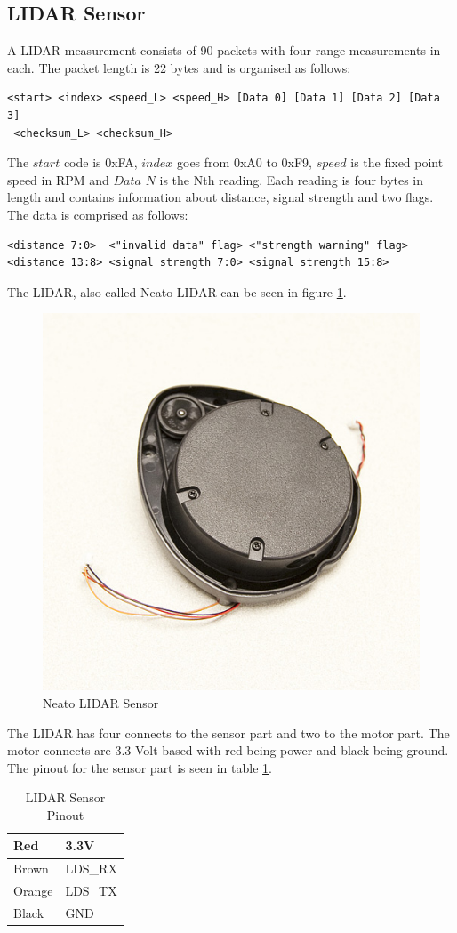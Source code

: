 \subsection{LIDAR Sensor}
A LIDAR measurement consists of 90 packets with four range measurements in each. The packet length is 22 bytes and is organised as follows\cite{LIDAR}:
\begin{verbatim}
<start> <index> <speed_L> <speed_H> [Data 0] [Data 1] [Data 2] [Data 3]
 <checksum_L> <checksum_H>
\end{verbatim}
The $start$ code is 0xFA, $index$ goes from 0xA0 to 0xF9, $speed$ is the fixed point speed in RPM and $Data$ $N$ is the Nth reading. Each reading is four bytes in length and contains information about distance, signal strength and two flags. The data is comprised as follows:
\begin{verbatim}
<distance 7:0>  <"invalid data" flag> <"strength warning" flag> 
<distance 13:8> <signal strength 7:0> <signal strength 15:8>
\end{verbatim}
The LIDAR, also called Neato LIDAR can be seen in figure \ref{fig:NeatoLidar}.
\begin{figure}[H]
\centering
\includegraphics[scale=1]{billeder/NeatoLidar}
\caption{Neato LIDAR Sensor}
\label{fig:NeatoLidar}
\end{figure}
The LIDAR has four connects to the sensor part and two to the motor part. The motor connects are 3.3 Volt based with red being power and black being ground. The pinout for the sensor part is seen in table \ref{tab:lidars}.
\begin{table}[H]
\centering
\begin{tabular}{|l|l|}
\hline
Red & 3.3V \\ \hline
Brown & LDS\_RX \\ \hline
Orange & LDS\_TX \\ \hline
Black & GND \\ \hline
\end{tabular}
\caption{LIDAR Sensor Pinout}
\label{tab:lidars}
\end{table}

